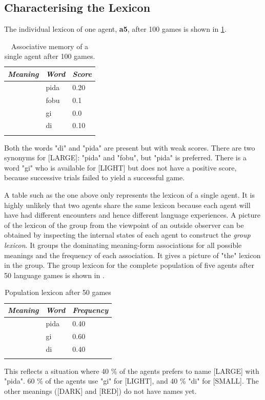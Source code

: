 \subsection{Characterising the Lexicon}

The individual lexicon of one
agent, {\bf a5}, after 100 games is shown in \ref{tab:t-mem3}. 
\begin{table}
\begin{center}
\begin{tabular}{l  l  l }
\lsptoprule 
{\it Meaning} & {\it Word} & {\it Score} \\ \midrule
[LARGE]& pida& 0.20\\ \midrule
  & fobu& 0.1\\ \midrule
[LIGHT]& gi& 0.0\\ \midrule
[SMALL]& di & 0.10\\ \midrule
\lspbottomrule
\end{tabular}
\caption{\label{tab:t-mem3} Associative memory of a single agent after 100 games.}
\end{center}
\end{table}
Both the words "di" and "pida" are present but with 
weak scores. There are two synonyms for 
[LARGE]: "pida" and "fobu", but "pida" is 
preferred. There is a word "gi" who is available 
for [LIGHT] but does not have a positive score,
because successive trials failed to yield a successful game. 

A table such as the one above only represents the lexicon
of a single agent. It is highly unlikely that two agents
share the same lexicon because each agent will have 
had different encounters and hence different language
experiences. A picture of the lexicon of the group from the 
viewpoint of an outside observer can be obtained by
inspecting the internal states of each agent to 
construct the {\it group lexicon}. It groups the 
dominating meaning-form associations for all possible
meanings and the frequency of each association. 
It gives a picture of "the" lexicon 
in the group. The group lexicon
for the complete population of five agents after 50 language games
is shown in . 
\begin{table}
\begin{center}
\begin{tabular}{l  l  l }
\lsptoprule 
{\it Meaning}& {\it Word} & {\it Frequency} \\ \midrule 
[LARGE]& pida& 0.40\\ \midrule
[LIGHT]& gi & 0.60\\ \midrule
[SMALL]& di & 0.40\\ \midrule
\lspbottomrule
\end{tabular}
\caption{\label{tab:t-mem4} Population lexicon after 50 games}
\end{center}
\end{table}
This reflects a situation where 40 \%
of the agents prefers to name [LARGE] with
"pida". 60 \% of the agents
use "gi" for [LIGHT], and 40 \% "di" for [SMALL]. 
The other meanings ([DARK] and [RED]) do not have names yet. 

